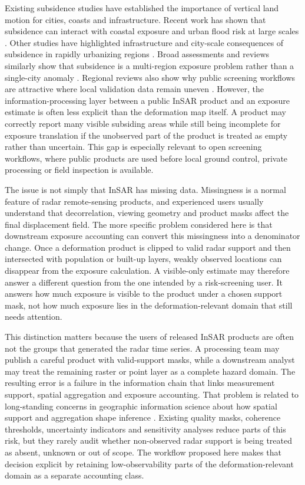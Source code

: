 \documentclass[pdflatex,sn-mathphys-ay]{sn-jnl}
\begin{document}
Existing subsidence studies have established the importance of vertical land motion for cities, coasts and infrastructure. Recent work has shown that subsidence can interact with coastal exposure and urban flood risk at large scales \citep{ohenhen2023atlantic,ohenhen2024disappearing}. Other studies have highlighted infrastructure and city-scale consequences of subsidence in rapidly urbanizing regions \citep{ohenhen2025infrastructure,sadhasivam2025megacities}. Broad assessments and reviews similarly show that subsidence is a multi-region exposure problem rather than a single-city anomaly \citep{herrera2021global,raspini2022subsidence_review,huning2024globalsubsidence}. Regional reviews also show why public screening workflows are attractive where local validation data remain uneven \citep{gogoi2025india_review}. However, the information-processing layer between a public InSAR product and an exposure estimate is often less explicit than the deformation map itself. A product may correctly report many visible subsiding areas while still being incomplete for exposure translation if the unobserved part of the product is treated as empty rather than uncertain. This gap is especially relevant to open screening workflows, where public products are used before local ground control, private processing or field inspection is available.

The issue is not simply that InSAR has missing data. Missingness is a normal feature of radar remote-sensing products, and experienced users usually understand that decorrelation, viewing geometry and product masks affect the final displacement field. The more specific problem considered here is that downstream exposure accounting can convert this missingness into a denominator change. Once a deformation product is clipped to valid radar support and then intersected with population or built-up layers, weakly observed locations can disappear from the exposure calculation. A visible-only estimate may therefore answer a different question from the one intended by a risk-screening user. It answers how much exposure is visible to the product under a chosen support mask, not how much exposure lies in the deformation-relevant domain that still needs attention.

This distinction matters because the users of released InSAR products are often not the groups that generated the radar time series. A processing team may publish a careful product with valid-support masks, while a downstream analyst may treat the remaining raster or point layer as a complete hazard domain. The resulting error is a failure in the information chain that links measurement support, spatial aggregation and exposure accounting. That problem is related to long-standing concerns in geographic information science about how spatial support and aggregation shape inference \citep{goodchild1992giscience,openshaw1984maup}. Existing quality masks, coherence thresholds, uncertainty indicators and sensitivity analyses reduce parts of this risk, but they rarely audit whether non-observed radar support is being treated as absent, unknown or out of scope. The workflow proposed here makes that decision explicit by retaining low-observability parts of the deformation-relevant domain as a separate accounting class.
\end{document}
